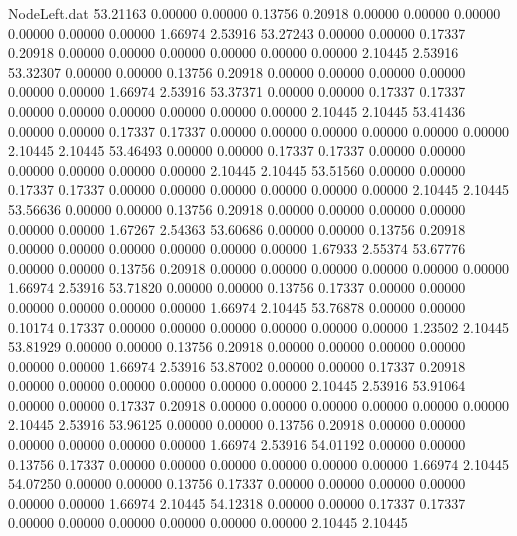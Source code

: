 \begin{filecontents}{NodeLeft.dat}
  53.21163    0.00000    0.00000     0.13756    0.20918    0.00000    0.00000    0.00000    0.00000    0.00000    0.00000    1.66974    2.53916
  53.27243    0.00000    0.00000     0.17337    0.20918    0.00000    0.00000    0.00000    0.00000    0.00000    0.00000    2.10445    2.53916
  53.32307    0.00000    0.00000     0.13756    0.20918    0.00000    0.00000    0.00000    0.00000    0.00000    0.00000    1.66974    2.53916
  53.37371    0.00000    0.00000     0.17337    0.17337    0.00000    0.00000    0.00000    0.00000    0.00000    0.00000    2.10445    2.10445
  53.41436    0.00000    0.00000     0.17337    0.17337    0.00000    0.00000    0.00000    0.00000    0.00000    0.00000    2.10445    2.10445
  53.46493    0.00000    0.00000     0.17337    0.17337    0.00000    0.00000    0.00000    0.00000    0.00000    0.00000    2.10445    2.10445
  53.51560    0.00000    0.00000     0.17337    0.17337    0.00000    0.00000    0.00000    0.00000    0.00000    0.00000    2.10445    2.10445
  53.56636    0.00000    0.00000     0.13756    0.20918    0.00000    0.00000    0.00000    0.00000    0.00000    0.00000    1.67267    2.54363
  53.60686    0.00000    0.00000     0.13756    0.20918    0.00000    0.00000    0.00000    0.00000    0.00000    0.00000    1.67933    2.55374
  53.67776    0.00000    0.00000     0.13756    0.20918    0.00000    0.00000    0.00000    0.00000    0.00000    0.00000    1.66974    2.53916
  53.71820    0.00000    0.00000     0.13756    0.17337    0.00000    0.00000    0.00000    0.00000    0.00000    0.00000    1.66974    2.10445
  53.76878    0.00000    0.00000     0.10174    0.17337    0.00000    0.00000    0.00000    0.00000    0.00000    0.00000    1.23502    2.10445
  53.81929    0.00000    0.00000     0.13756    0.20918    0.00000    0.00000    0.00000    0.00000    0.00000    0.00000    1.66974    2.53916
  53.87002    0.00000    0.00000     0.17337    0.20918    0.00000    0.00000    0.00000    0.00000    0.00000    0.00000    2.10445    2.53916
  53.91064    0.00000    0.00000     0.17337    0.20918    0.00000    0.00000    0.00000    0.00000    0.00000    0.00000    2.10445    2.53916
  53.96125    0.00000    0.00000     0.13756    0.20918    0.00000    0.00000    0.00000    0.00000    0.00000    0.00000    1.66974    2.53916
  54.01192    0.00000    0.00000     0.13756    0.17337    0.00000    0.00000    0.00000    0.00000    0.00000    0.00000    1.66974    2.10445
  54.07250    0.00000    0.00000     0.13756    0.17337    0.00000    0.00000    0.00000    0.00000    0.00000    0.00000    1.66974    2.10445
  54.12318    0.00000    0.00000     0.17337    0.17337    0.00000    0.00000    0.00000    0.00000    0.00000    0.00000    2.10445    2.10445

\end{filecontents}
